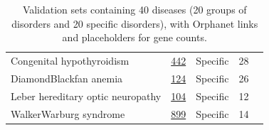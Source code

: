 \begin{table}[ht]
\begin{tabular}{l l l l c}
Congenital hypothyroidism & \href{https://www.orpha.net/en/disease/detail/442}{442} & Specific & 28 \\
DiamondBlackfan anemia & \href{https://www.orpha.net/en/disease/detail/124}{124} & Specific & 26 \\
Leber hereditary optic neuropathy & \href{https://www.orpha.net/en/disease/detail/104}{104} & Specific & 12 \\
WalkerWarburg syndrome & \href{https://www.orpha.net/en/disease/detail/899}{899} & Specific & 14 \\
\hline
\end{tabular}
\caption{Validation sets containing 40 diseases (20 groups of disorders and 20 specific disorders), with Orphanet links and placeholders for gene counts.}
\label{tab:rare-validation-traits}
\end{table}